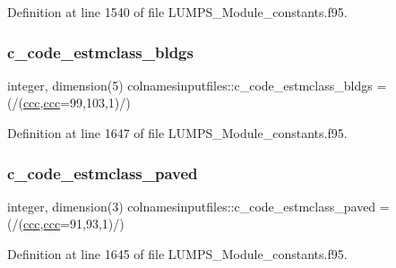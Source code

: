 Definition at line 1540 of file L\+U\+M\+P\+S\+\_\+\+Module\+\_\+constants.\+f95.

\mbox{\label{namespacecolnamesinputfiles_a504446b38136e15c388676ef3df18a09}} 
\subsubsection{\texorpdfstring{c\+\_\+code\+\_\+estmclass\+\_\+bldgs}{c\_code\_estmclass\_bldgs}}
{\footnotesize\ttfamily integer, dimension(5) colnamesinputfiles\+::c\+\_\+code\+\_\+estmclass\+\_\+bldgs = (/(\hyperlink{namespacecolnamesinputfiles_adb0ede73a6346d7e8fd56b1f1e3d1fc4}{ccc},\hyperlink{namespacecolnamesinputfiles_adb0ede73a6346d7e8fd56b1f1e3d1fc4}{ccc}=99,103,1)/)}



Definition at line 1647 of file L\+U\+M\+P\+S\+\_\+\+Module\+\_\+constants.\+f95.

\mbox{\label{namespacecolnamesinputfiles_a52858a619825d8cd3e612737eedfcbdb}} 
\subsubsection{\texorpdfstring{c\+\_\+code\+\_\+estmclass\+\_\+paved}{c\_code\_estmclass\_paved}}
{\footnotesize\ttfamily integer, dimension(3) colnamesinputfiles\+::c\+\_\+code\+\_\+estmclass\+\_\+paved = (/(\hyperlink{namespacecolnamesinputfiles_adb0ede73a6346d7e8fd56b1f1e3d1fc4}{ccc},\hyperlink{namespacecolnamesinputfiles_adb0ede73a6346d7e8fd56b1f1e3d1fc4}{ccc}=91,93,1)/)}



Definition at line 1645 of file L\+U\+M\+P\+S\+\_\+\+Module\+\_\+constants.\+f95.

\mbox{\label{namespacecolnamesinputfiles_aeade668094b48396c577d712f18cddef}} 
